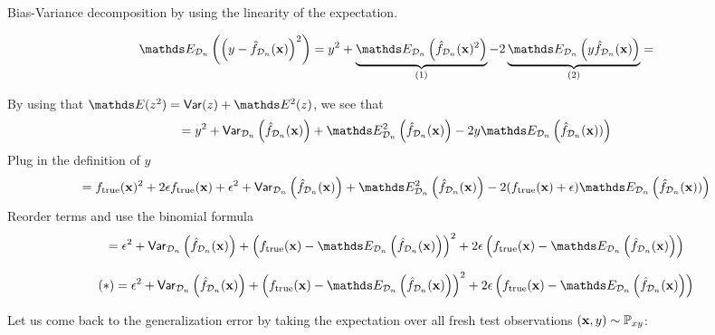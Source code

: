 \documentclass[11pt,compress,t,notes=noshow, xcolor=table]{beamer}
\begin{document}
\begin{vbframe} {Bias-Variance decomposition}
by using the linearity of the expectation.  %

\framebreak
\begin{footnotesize}
$$
\E_{\D_n}\left(\left(y - \fh_{\D_n}(\xv)\right)^2\right) = 
y^2 + \underbrace{\E_{\D_n}\left(\fh_{\D_n}(\xv)^2\right)}_{(1)}  - 2\underbrace{\E_{\D_n}\left(y\fh_{\D_n}(\xv)\right)}_{(2)} =
$$
\end{footnotesize}


\begin{footnotesize}
By using that $\E(z^2) =\var(z) + \E^2(z)$, we see that
$$
= y^2 + \var_{\D_n}\left(\fh_{\D_n}(\xv)\right) + \E^2_{\D_n}\left(\fh_{\D_n}(\xv)\right) - 2y \E_{\D_n}\left(\fh_{\D_n}(\xv))\right) 
$$
Plug in the definition of $y$
$$
 = \ftrue(\xv)^2 +2\epsilon\ftrue(\xv) + \epsilon^2 + \var_{\D_n}\left(\fh_{\D_n}(\xv)\right) + \E^2_{\D_n}\left(\fh_{\D_n}(\xv)\right) - 2 (\ftrue(\xv)+\epsilon)\E_{\D_n}\left(\fh_{\D_n}(\xv))\right) 
$$
Reorder terms and use the binomial formula
$$
= \epsilon^2 + \var_{\D_n}\left(\fh_{\D_n}(\xv)\right) + 
  \left(\ftrue(\xv) - \E_{\D_n}\left(\fh_{\D_n}(\xv)\right)\right)^2
 +2 \epsilon \left(\ftrue(\xv) - \E_{\D_n}\left(\fh_{\D_n}(\xv)\right)\right)
$$
\end{footnotesize}


\framebreak 

\begin{footnotesize}
$$
(*) = \epsilon^2 + \var_{\D_n}\left(\fh_{\D_n}(\xv)\right) + 
  \left(\ftrue(\xv) - \E_{\D_n}\left(\fh_{\D_n}(\xv)\right)\right)^2
 +2 \epsilon \left(\ftrue(\xv) - \E_{\D_n}\left(\fh_{\D_n}(\xv)\right)\right)
$$
\end{footnotesize}

Let us come back to the generalization error by taking the expectation over all fresh test observations $(\mathbf{x}, y) \sim \mathbb{P}_{xy}$: 


\end{vbframe}
\end{document}
